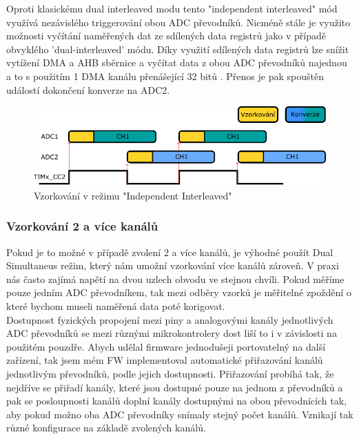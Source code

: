 Oproti klasickému dual interleaved modu tento "independent interleaved" mód využívá nezávislého triggerování obou ADC převodníků. Nicméně stále je využito možnosti vyčítání naměřených dat ze sdílených data registrů jako v případě obvyklého 'dual-interleaved' módu. Díky využití sdílených data registrů lze snížit vytížení DMA a AHB sběrnice a vyčítat data z obou ADC převodníků najednou a to s použitím 1 DMA kanálu přenášející 32 bitů . Přenos je pak spouštěn událostí dokončení konverze na ADC2.

\begin{figure}[H]
	\centering
	\includegraphics[width=0.9\linewidth]{Figs/Diagrams/SVG/Interleaved.pdf}
	\caption{Vzorkování v režimu "Independent Interleaved"}
	\label{fig:dualinterleaved}
\end{figure}



\subsubsection{Vzorkování 2 a více kanálů}
Pokud je to možné v případě zvolení 2 a více kanálů, je výhodné použít Dual Simultaneus režim, který nám umožní vzorkování více kanálů zároveň. V praxi nás často zajímá napětí na dvou uzlech obvodu ve stejnou chvíli. Pokud měříme pouze jedním ADC převodníkem, tak mezi odběry vzorků je měřitelné zpoždění o které bychom museli naměřená data poté korigovat.\\

Dostupnost fyzických propojení mezi piny a analogovými kanály jednotlivých ADC převodníků se mezi různými mikrokontrolery dost liší to i v závislosti na použitém pouzdře. Abych udělal firmware jednodušeji portovatelný na další zařízení, tak jsem mém FW implementoval automatické přiřazování kanálů jednotlivým převodníků, podle jejich dostupnosti. Přiřazování probíhá tak, že nejdříve se přiřadí kanály, které jsou dostupné pouze na jednom z převodníků a pak se posloupnosti kanálů doplní kanály dostupnými na obou převodnících tak, aby pokud možno oba ADC převodníky snímaly stejný počet kanálů. Vznikají tak různé konfigurace na základě zvolených kanálů.\\


